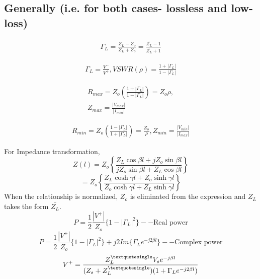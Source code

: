 \subsection*{Generally (i.e. for both cases- lossless and low-loss)}

\begin{align*}
\Gamma_L = \frac{Z_L - Z_o}{Z_L + Z_o} = \frac{\bar{Z_L} - 1}{\bar{Z_L} + 1}
\end{align*}

\begin{align*}
\Gamma_L = \frac{V^-}{V^+},
VSWR(\rho) = \frac{1 + |\Gamma_L|}{1 - |\Gamma_L|}
\end{align*}

\begin{align*}
R_{max} = Z_o \left( \frac{1 + |\Gamma_L|}{1 - |\Gamma_L|}\right) = Z_o \rho,\\
Z_{max} = \frac{|V_{max}|}{|I_{min}|}
\end{align*}

\begin{align*}
R_{min} = Z_o \left(\frac{1 - |\Gamma_L|}{1 + |\Gamma_L|}\right) = \frac{Z_o}{\rho}, Z_{min} = \frac{|V_{min}|}{|I_{max}|}
\end{align*}

For Impedance transformation, 
$$Z(l) = Z_o\left\{\frac{Z_L\cos\beta l + jZ_o\sin\beta l}{jZ_o\sin\beta l + Z_L\cos\beta l}\right\} $$
$$= Z_o\left\{\frac{Z_L\cosh\gamma l + Z_o\sinh\gamma l}{Z_o\cosh\gamma l + Z_L\sinh\gamma l}\right\}	$$
When the relationship is normalized, $Z_o$ is eliminated from the expression and $Z_L$ takes the form $\bar{Z_L}$.
$$P = \frac{1}{2}\frac{|V^+|}{Z_o}\lbrace 1 - |\Gamma_L|^2\rbrace --\text{Real power}	$$
$$P = \frac{1}{2}\frac{|V^+|}{Z_o}\lbrace 1 - |\Gamma_L|^2\rbrace + j2Im\lbrace \Gamma_L e^{- j2\beta l}\rbrace --\text{Complex power}$$
$$V^+ = \dfrac{Z_L^{\textquotesingle}V_s e^{-j\beta l}}{(Z_s + Z_L^{\textquotesingle})(1 + \Gamma_L e^{-j2\beta
l})}$$